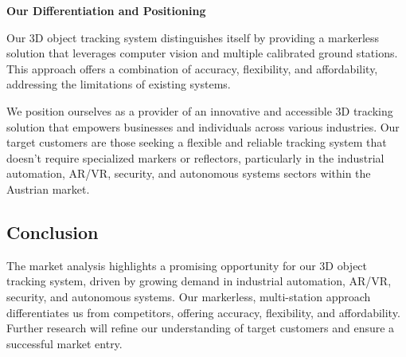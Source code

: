 \textbf{Our Differentiation and Positioning}

Our 3D object tracking system distinguishes itself by providing a markerless solution that leverages computer vision and multiple calibrated ground stations. This approach offers a combination of accuracy, flexibility, and affordability, addressing the limitations of existing systems.

We position ourselves as a provider of an innovative and accessible 3D tracking solution that empowers businesses and individuals across various industries. Our target customers are those seeking a flexible and reliable tracking system that doesn't require specialized markers or reflectors, particularly in the industrial automation, AR/VR, security, and autonomous systems sectors within the Austrian market.

\subsection{Conclusion}

The market analysis highlights a promising opportunity for our 3D object tracking system, driven by growing demand in industrial automation, AR/VR, security, and autonomous systems. Our markerless, multi-station approach differentiates us from competitors, offering accuracy, flexibility, and affordability. Further research will refine our understanding of target customers and ensure a successful market entry.